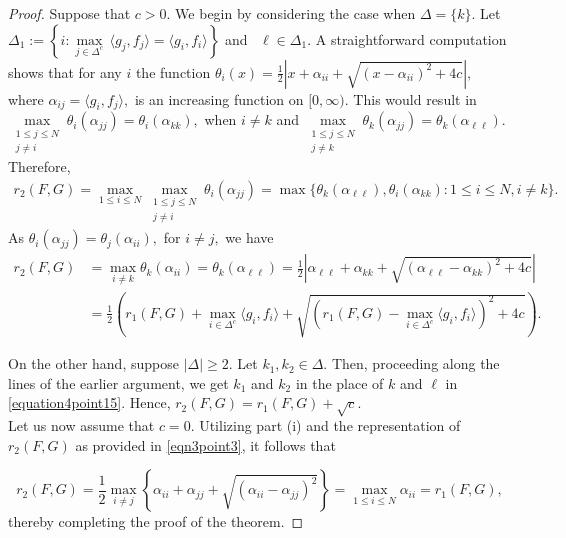 \documentclass[final,1p,times]{elsarticle}
\begin{document}
	\begin{proof}
		Suppose that $c > 0.$ We begin by considering the case when $\Delta = \{k\}.$ Let $\Delta_1 := \left\{i : \max\limits_{j \in \Delta^c} \, \langle g_j , f_j \rangle  = \langle g_i , f_i \rangle  \right\}$ and \, $ \ell \in \Delta_1.$ A straightforward computation shows that for any $i$ the function  $\theta_i(x) = \frac{1}{2} \left| x +\alpha_{ii} + \sqrt{(x -\alpha_{ii})^{2}+4c} \right |,$ where $\alpha_{ij} = \langle g_i,f_j \rangle,$ is an increasing function on $[0,\infty).$ This would result in $\max\limits_{\substack{1 \leq j \leq N \\ j \neq i}} \theta_i(\alpha_{jj}) = \theta_i( \alpha_{kk}),$ when $i \neq k$ and $\max\limits_{\substack{1 \leq j \leq N \\ j \neq k}} \theta_k( \alpha_{jj})= \theta_k( \alpha_{\ell \ell}). $ Therefore,
		\begin{align*}
			r_{2}(F,G) = \max\limits_{1 \leq i \leq N} \max\limits_{\substack{1 \leq j \leq N \\ j \neq i}} \theta_i( \alpha_{jj})
			= \max \bigg\{ \theta_k( \alpha_{\ell \ell}), \theta_i( \alpha_{kk}) : 1 \leq i \leq N, i \neq k \bigg\}.
		\end{align*}
		As $\theta_i( \alpha_{jj}) = \theta_j( \alpha_{ii}),$ for $i \neq j,$ we have
		\begin{align}\label{equation4point15}
			r_{2} (F,G) &= \max\limits_{i \neq k } \theta_k( \alpha_{ii}) = \theta_k( \alpha_{\ell \ell}) = \frac{1}{2}\left|   \alpha_{\ell \ell}  +  \alpha_{kk} +  \sqrt{( \alpha_{\ell \ell} - \alpha_{kk})^{2}+4c}   \right| \\&= \frac{1}{2} \left( r_{1} (F,G) + \max\limits_{i \in \Delta^c } \langle g_i , f_i \rangle + \sqrt{\left( r_{1} (F,G)  - \max\limits_{i \in \Delta^c } \langle g_i , f_i \rangle \right)^2 + 4c} \right). \nonumber
		\end{align}
		
		On the other hand, suppose $|\Delta| \geq 2.$ Let $k_1,k_2 \in \Delta.$ Then, proceeding along the lines of the earlier argument, we get $k_1$ and $k_2$ in the place of $k$ and $\ell$ in \eqref{equation4point15}. Hence, $ r_{2} (F,G) = r_{1} (F,G) + \sqrt{c}.$\\
		Let us now assume that \( c = 0 \). Utilizing part (i) and the representation of \( r_{2}(F, G) \) as provided in \eqref{eqn3point3}, it follows that

\[
r_{2}(F, G) = \frac{1}{2} \max\limits_{i \neq j} \left\{ \alpha_{ii} + \alpha_{jj} + \sqrt{(\alpha_{ii} - \alpha_{jj})^2} \right\} = \max\limits_{1 \leq i \leq N} \alpha_{ii} = r_{1}(F, G),
\]
thereby completing the proof of the theorem.

	\end{proof}
	
\end{document}
